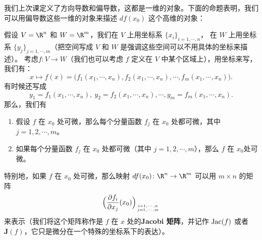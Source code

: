 我们上次课定义了方向导数和偏导数，这都是一维的对象。下面的命题表明，我们可以用偏导数这些一维的对象来描述 $df(x_0)$ 这个高维的对象：
\begin{prop}[微分的计算]
假设 $V=\R^n$ 和 $W=\R^m$，我们在 $V$ 上用坐标系 $\{x_i\}_{i=1,\cdots,n}$，
在 $W$ 上用坐标系 $\{y_j\}_{j=1,\cdots,m}$（把空间写成 $V$ 和 $W$ 是强调这些空间可以不用具体的坐标来描述）。
考虑$f\colon V\rightarrow W$（我们也可以考虑 $f$ 定义在 $V$ 中某个区域上），用坐标来写，我们有：
\[x\mapsto f(x)=\bigl(f_1(x_1,\cdots,x_n),f_2(x_1,\cdots,x_n),\cdots, f_m(x_1,\cdots,x_n)\bigr).\]
有时候还写成
\[y_1=f_1(x_1,\cdots,x_n), \ y_2=f_2(x_1,\cdots,x_n),\cdots, y_m=f_m(x_1,\cdots,x_n).\]
那么，我们有

\begin{enumerate}[label = \arabic*)]
\item 假设 $f$ 在 $x_0$ 处可微，那么每个分量函数 $f_j$ 在 $x_0$ 处都可微，其中 $j=1,2,\cdots, m$。
\item 如果每个分量函数 $f_j$ 在 $x_0$ 处都可微（其中 $j=1,2,\cdots, m$），那么 $f$ 在 $x_0$处可微。
\end{enumerate}
特别地，如果 $f$ 在 $x_0$ 处可微，那么映射 $df(x_0)\colon\R^n\rightarrow \R^m$ 可以用 $m\times n$ 的矩阵
\[\Bigl(\frac{\partial f_i}{\partial x_j}(x_0)\Bigr)_{i=1,\cdots,n \atop j=1,\cdots,m}\]
来表示（我们将这个矩阵称作是 $f$ 在 $x$ 处的{\bf Jacobi 矩阵}，并记作 ${\rm Jac}(f)$ 或者 $\mathbf{J}(f)$，{\color{blue}它只是微分在一个特殊的坐标系下的表达}）。
\end{prop}

